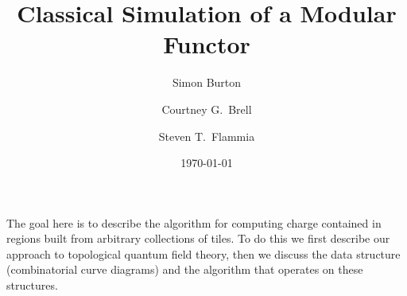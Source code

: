 \documentclass[aps, prl, letterpaper, twocolumn, superscriptaddress, notitlepage, 10pt]{revtex4-1}
\begin{document}
\title{Classical Simulation of a Modular Functor}

\author{Simon Burton}
\author{Courtney G.\ Brell}
\author{Steven T.\ Flammia}

\date{\today}

\maketitle


\onecolumngrid
\appendix



The goal here is to describe the algorithm for
computing charge contained in regions built from 
arbitrary collections of tiles.
To do this we first describe our approach
to topological quantum field theory,
then we discuss the data structure 
(combinatorial curve diagrams) and the algorithm
that operates on these structures.


%
%
\end{document}

